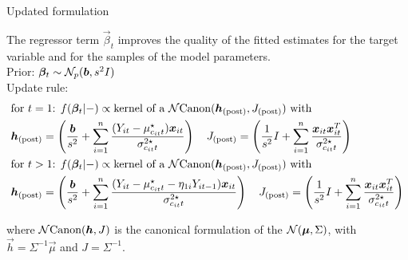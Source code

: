 \documentclass[
	11pt, %
 xcolor={dvipsnames,svgnames}
]{beamer}
\newcommand\numberthis{\addtocounter{equation}{1}\tag{\theequation}}
\begin{document}
\begin{frame}{Updated formulation}

The regressor term $\vec{\beta}_t$ \alert{improves the quality of the fitted estimates} for the target variable and for the samples of the model parameters.\\[6pt]
Prior: $\boldsymbol{\beta}_t \sim \mathcal{N}_p(\boldsymbol{b},s^2 I)$\\
Update rule:
{\footnotesize
\begin{align*}
&  \text{for $t=1$} \text{: } f(\boldsymbol{\beta}_t|-) \propto \text{kernel of a $\mathcal{N}\text{Canon}(\boldsymbol{h}_{\text{(post)}}, J_{\text{(post)}})$ with}\\
&\boldsymbol{h}_{\text{(post)}} = \left( \frac{\boldsymbol{b}}{s^2} +\sum_{i=1}^n \frac{(Y_{it}-\mu^\star_{c_{it}t})\boldsymbol{x}_{it}}{\sigma^{2\star}_{c_{it}t}} \right) \quad
J_{\text{(post)}} = \left( \frac{1}{s^2}I + \sum_{i=1}^n \frac{\boldsymbol{x}_{it}\boldsymbol{x}_{it}^T}{\sigma^{2\star}_{c_{it}t}}\right)\\
& \text{for $t>1$} \text{: }
  f(\boldsymbol{\beta}_t|-) \propto \text{kernel of a $\mathcal{N}\text{Canon}(\boldsymbol{h}_{\text{(post)}}, J_{\text{(post)}})$ with}\\
&\boldsymbol{h}_{\text{(post)}} = \left( \frac{\boldsymbol{b}}{s^2} +\sum_{i=1}^n \frac{(Y_{it}-\mu^\star_{c_{it}t}- \eta_{1i}Y_{it-1})\boldsymbol{x}_{it}}{\sigma^{2\star}_{c_{it}t}} \right) \quad
J_{\text{(post)}}  = \left( \frac{1}{s^2}I + \sum_{i=1}^n \frac{\boldsymbol{x}_{it}\boldsymbol{x}_{it}^T}{\sigma^{2\star}_{c_{it}t}}\right)
\end{align*}
}

where $\mathcal{N}\text{Canon}(\boldsymbol{h},J)$ is the canonical formulation of the $\mathcal{N}(\boldsymbol{\mu},\Sigma)$, with $\vec{h} = \Sigma^{-1}\vec{\mu}$ and $J = \Sigma^{-1}$.
\end{frame}
\end{document}
